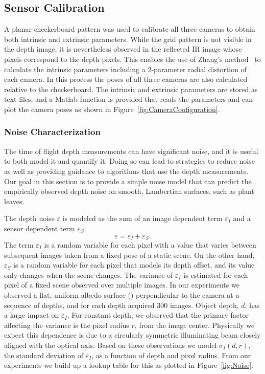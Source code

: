 

\subsection{Sensor Calibration}

A planar checkerboard pattern was used to calibrate all three cameras to obtain both intrinsic and extrinsic parameters.
While the grid pattern is not visible in the depth image, it is nevertheless observed in the reflected IR image whose pixels correspond to the depth pixels.
This enables the use of Zhang's method~\cite{Zhang2000} to calculate the intrinsic parameters including a $2$-parameter radial distortion of each camera.
In this process the poses of all three cameras are also calculated relative to the checkerboard.
The intrinsic and extrinsic parameters are stored as text files, and a Matlab function is provided that reads the parameters and can plot the camera poses as shown in Figure~\ref{fig:CameraConfiguration}.


\subsubsection{Noise Characterization}
\label{sec:bias}

The time of flight depth measurements can have significant noise, and it is useful to both model it and quantify it.
Doing so can lead to strategies to reduce noise as well as providing guidance to algorithms that use the depth measurements.
Our goal in this section is to provide a simple noise model that can predict the empirically observed depth noise on smooth, Lambertian surfaces, such as plant leaves.

The depth noise $\varepsilon$ is modeled as the sum of an image dependent term $\varepsilon_I$ and a sensor dependent term $\varepsilon_S$:
\begin{equation}
\varepsilon = \varepsilon_I + \varepsilon_S. \label{eq:epsilon}
\end{equation}
The term $\varepsilon_I$ is a random variable for each pixel with a value that varies between subsequent images taken from a fixed pose of a static scene.
On the other hand, $\varepsilon_S$ is a random variable for each pixel that models its depth offset, and its value only changes when the scene changes.
The variance of $\varepsilon_I$ is estimated for each pixel of a fixed scene observed over multiple images.
In our experiments we observed a flat, uniform albedo surface () perpendicular to the camera at a sequence of depths, and for each depth acquired $300$ images.
Object depth, $d$, has a large impact on $\varepsilon_I$.
For constant depth, we observed that the primary factor affecting the variance is the pixel radius $r$, from the image center.
Physically we expect this dependence is due to a circularly symmetric illuminating beam closely aligned with the optical axis.
Based on these observations we model $\sigma_I(d,r)$, the standard deviation of $\varepsilon_I$, as a function of depth and pixel radius.
From our experiments we build up a lookup table for this as plotted in Figure~\ref{fig:Noise}.

